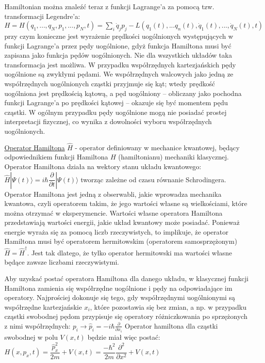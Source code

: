 Hamiltonian można znaleźć teraz z funkcji Lagrange’a za pomocą tzw. transformacji Legendre’a:\newline
$ H = H(q_1,...,q_N,p_1,...,p_N,t) = \sum_{i}\dot{q}_j p_j - L(q_1(t),...q_n(t),\dot{q}_1(t),...,\dot{q}_N(t),t)  $ \newline
przy czym konieczne jest wyrażenie prędkości uogólnionych występujących w funkcji Lagrange’a przez pędy uogólnione, gdyż funkcja Hamiltona musi być zapisana jako funkcja pędów uogólnionych. Nie dla wszystkich układów taka transformacja jest możliwa. W przypadku współrzędnych kartezjańskich pędy uogólnione są zwykłymi pędami. We współrzędnych walcowych jako jedną ze współrzędnych uogólnionych cząstki przyjmuje się kąt; wtedy prędkość uogólniona jest prędkością kątową, a pęd uogólniony – obliczany jako pochodna funkcji Lagrange’a po prędkości kątowej – okazuje się być momentem pędu cząstki. W ogólnym przypadku pędy uogólnione mogą nie posiadać prostej interpretacji fizycznej, co wynika z dowolności wyboru współrzędnych uogólnionych.

\underline{Operator Hamiltona} $ \hat{H} $ - operator definiowany w mechanice kwantowej, będący odpowiednikiem funkcji Hamiltona $ H $ (hamiltonianu) mechaniki klasycznej. Operator Hamiltona działa na wektory stanu układu kwantowego: \newline
$ \hat{H}|\Psi(t) \rangle = i\hbar\dfrac{\partial}{\partial t}|\Psi(t) \rangle $\newline
tworząc zależne od czasu równanie Schrodingera. Operator Hamiltona jest jedną z obserwabli, jakie wprowadza mechanika kwantowa, czyli operatorem takim, że jego wartości własne są wielkościami, które można otrzymać w eksperymencie. Wartości własne operatora Hamiltona przedstawiają wartości energii, jakie układ kwantowy może posiadać. Ponieważ energie wyraża się za pomocą liczb rzeczywistych, to implikuje, że operator Hamiltona musi być operatorem hermitowskim (operatorem samosprzężonym) $ \hat{H} = \hat{H}^\dag $. Jest tak dlatego, że tylko operator hermitowski ma wartości własne będące zawsze liczbami rzeczywistymi.

Aby uzyskać postać operatora Hamiltona dla danego układu, w klasycznej funkcji Hamiltona zamienia się współrzędne uogólnione i pędy na odpowiadające im operatory. Najprościej dokonuje się tego, gdy współrzędnymi uogólnionymi są współrzędne kartezjańskie $ x_i $, które pozostawia się bez zmian, a np. w przypadku cząstki swobodnej pędom przypisuje się operatory różniczkowania po sprzężonych z nimi współrzędnych:\newline
$ p_i \rightarrow \hat{p}_i = -i\hbar \frac{\partial}{\partial x_i} $\newline
Operator hamiltona dla cząstki swobodnej w polu $ V(x,t) $ będzie miał więc postać:\newline
$ H(x, p_x, t) = \dfrac{\hat{p}_x^2}{2m} + V(x,t) = \dfrac{-\hbar^2}{2m}\dfrac{\partial^2}{\partial x^2} + V(x,t) $\newline

